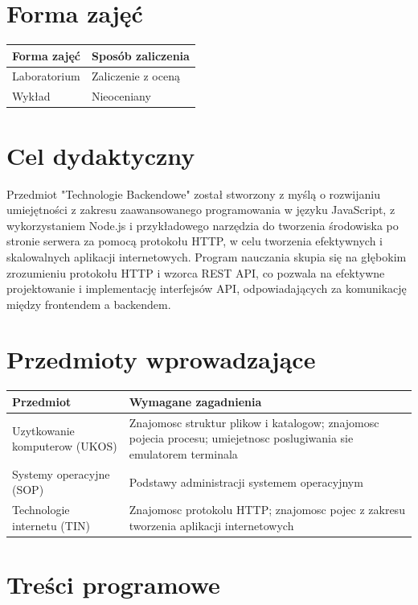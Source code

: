 \documentclass[12pt, a4paper]{article}
\begin{document}
\section{Forma zajęć}

\begin{tabular}{ll}
  \hline
  \textbf{Forma zajęć} & \textbf{Sposób zaliczenia} \\
  \hline
  Laboratorium & Zaliczenie z oceną \\
  Wykład & Nieoceniany \\
  \hline
\end{tabular}

\section{Cel dydaktyczny}

Przedmiot "Technologie Backendowe" został stworzony z myślą o rozwijaniu umiejętności z zakresu zaawansowanego programowania w języku JavaScript, z wykorzystaniem Node.js i przykładowego narzędzia do tworzenia środowiska po stronie serwera za pomocą protokołu HTTP, w celu tworzenia efektywnych i skalowalnych aplikacji internetowych. Program nauczania skupia się na głębokim zrozumieniu protokołu HTTP i wzorca REST API, co pozwala na efektywne projektowanie i implementację interfejsów API, odpowiadających za komunikację między frontendem a backendem.

\section{Przedmioty wprowadzające}

\begin{tabularx}{\textwidth}{lX}
  \hline
  \textbf{Przedmiot} & \textbf{Wymagane zagadnienia} \\
  \hline
  Uzytkowanie komputerow (UKOS) & Znajomosc struktur plikow i katalogow; znajomosc pojecia procesu; umiejetnosc poslugiwania sie emulatorem terminala \\
  Systemy operacyjne (SOP) & Podstawy administracji systemem operacyjnym \\
  Technologie internetu (TIN) & Znajomosc protokolu HTTP; znajomosc pojec z zakresu tworzenia aplikacji internetowych \\
  \hline
\end{tabularx}

\section{Treści programowe}
\end{document}

